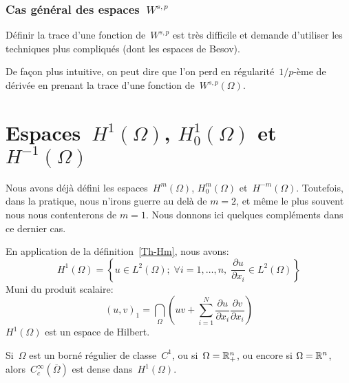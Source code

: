 \medskip
\subsubsection{Cas général des espaces~$W^{s,p}$}

Définir la trace d'une fonction de~$W^{s,p}$ est très difficile et demande d'utiliser les techniques plus compliqués (dont les espaces de Besov).

De façon plus intuitive, on peut dire que l'on perd en régularité~$1/p$-ème de dérivée en prenant la trace d'une fonction de~$W^{s,p}(\Omega)$.



\medskip
\section{Espaces~$H^1(\Omega)$, $H^1_0(\Omega)$ et~$H^{-1}(\Omega)$}

Nous avons déjà défini les espaces~$H^m(\Omega)$, $H^m_0(\Omega)$ et~$H^{-m}(\Omega)$.
Toutefois, dans la pratique, nous n'irons guerre au delà de $m=2$, et même le plus souvent nous nous contenterons de $m=1$. Nous donnons ici quelques compléments dans ce dernier cas.

\medskip
En application de la définition~\ref{Th-Hm}, nous avons:
\begin{equation}
H^1(\Omega)=\left\lbrace u\in L^2(\Omega);\; \forall i =1,\ldots,n,\; \frac{\partial u}{\partial x_i}\in L^2(\Omega) \right\rbrace
\end{equation}
Muni du produit scalaire:
\begin{equation}(u,v)_1 = \dint_{\Omega} \left(uv + \sum_{i=1}^N \frac{\partial u}{\partial x_i} \frac{\partial v}{\partial x_i} \right )
\end{equation}
$H^1(\Omega)$ est un espace de Hilbert.



\medskip
\begin{theoreme}
Si~$\Omega$ est un borné régulier de classe~$C^1$, ou si~$\Omega=\mathbb R^n_+$, ou encore si $\Omega=\mathbb R^n$, alors~$C_c^\infty(\overline{\Omega})$ est dense dans~$H^1(\Omega)$.
\end{theoreme}

